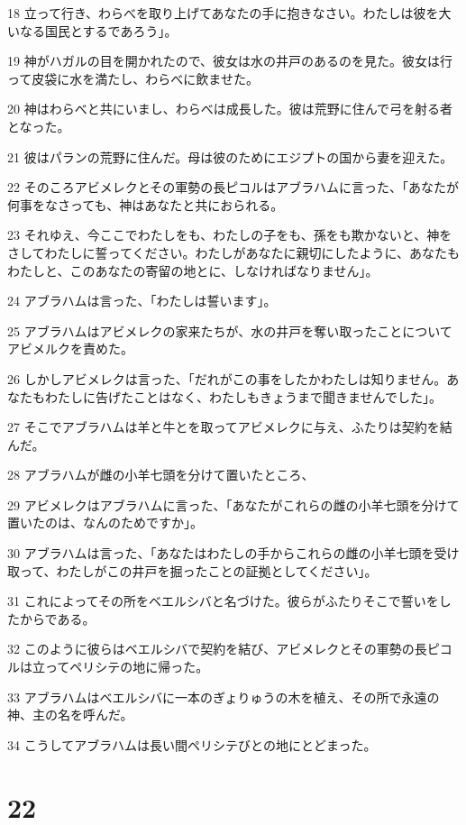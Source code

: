 \par 18 立って行き、わらべを取り上げてあなたの手に抱きなさい。わたしは彼を大いなる国民とするであろう」。
\par 19 神がハガルの目を開かれたので、彼女は水の井戸のあるのを見た。彼女は行って皮袋に水を満たし、わらべに飲ませた。
\par 20 神はわらべと共にいまし、わらべは成長した。彼は荒野に住んで弓を射る者となった。
\par 21 彼はパランの荒野に住んだ。母は彼のためにエジプトの国から妻を迎えた。
\par 22 そのころアビメレクとその軍勢の長ピコルはアブラハムに言った、「あなたが何事をなさっても、神はあなたと共におられる。
\par 23 それゆえ、今ここでわたしをも、わたしの子をも、孫をも欺かないと、神をさしてわたしに誓ってください。わたしがあなたに親切にしたように、あなたもわたしと、このあなたの寄留の地とに、しなければなりません」。
\par 24 アブラハムは言った、「わたしは誓います」。
\par 25 アブラハムはアビメレクの家来たちが、水の井戸を奪い取ったことについてアビメルクを責めた。
\par 26 しかしアビメレクは言った、「だれがこの事をしたかわたしは知りません。あなたもわたしに告げたことはなく、わたしもきょうまで聞きませんでした」。
\par 27 そこでアブラハムは羊と牛とを取ってアビメレクに与え、ふたりは契約を結んだ。
\par 28 アブラハムが雌の小羊七頭を分けて置いたところ、
\par 29 アビメレクはアブラハムに言った、「あなたがこれらの雌の小羊七頭を分けて置いたのは、なんのためですか」。
\par 30 アブラハムは言った、「あなたはわたしの手からこれらの雌の小羊七頭を受け取って、わたしがこの井戸を掘ったことの証拠としてください」。
\par 31 これによってその所をベエルシバと名づけた。彼らがふたりそこで誓いをしたからである。
\par 32 このように彼らはベエルシバで契約を結び、アビメレクとその軍勢の長ピコルは立ってペリシテの地に帰った。
\par 33 アブラハムはベエルシバに一本のぎょりゅうの木を植え、その所で永遠の神、主の名を呼んだ。
\par 34 こうしてアブラハムは長い間ペリシテびとの地にとどまった。

\chapter{22}

